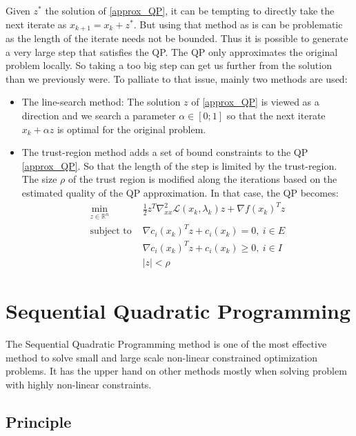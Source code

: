 Given $z^*$ the solution of \ref{approx_QP}, it can be tempting to directly take the next iterate as $x_{k+1} = x_k + z^*$.
But using that method as is can be problematic as the length of the iterate needs not be bounded.
Thus it is possible to generate a very large step that satisfies the QP.
The QP only approximates the original problem locally.
So taking a too big step can get us further from the solution than we previously were.
To palliate to that issue, mainly two methods are used:
\begin{itemize}
  \item The line-search method: The solution $z$ of \ref{approx_QP} is viewed as a direction and we search a parameter $\alpha\in [0;1]$ so that the next iterate $x_k + \alpha z$ is optimal for the original problem.
  \item The trust-region method adds a set of bound constraints to the QP \ref{approx_QP}. So that the length of the step is limited by the trust-region. The size $\rho$ of the trust region is modified along the iterations based on the estimated quality of the QP approximation. In that case, the QP becomes:
\begin{equation}
  \begin{array}{ll}
    \min\limits_{z\in \mathbb{R}^n}{} & \frac{1}{2}z^T\nabla_{xx}^2\mathcal{L}(x_k, \lambda_k)z + \nabla f(x_k)^Tz \\
    \text{subject to } & \nabla c_i(x_k)^Tz+c_i(x_k)=0,\ i\in E \\
                       & \nabla c_i(x_k)^Tz+c_i(x_k)\geq 0,\ i\in I\\
                       & |z|<\rho
  \end{array}
\end{equation}
\end{itemize}

\section{Sequential Quadratic Programming}
\label{sec:sequential_quadratic_programming}

The Sequential Quadratic Programming method is one of the most effective method to solve small and large scale non-linear constrained optimization problems.
It has the upper hand on other methods mostly when solving problem with highly non-linear constraints.

\subsection{Principle}
\label{sub:principle}

